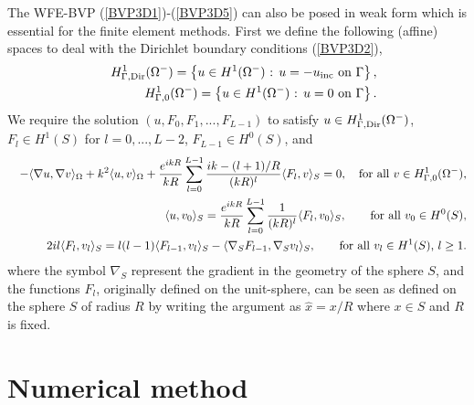 \documentclass[final,3p,times,12pt]{elsarticle}
\newcommand{\ra}{\rangle}
\newcommand{\la}{\langle}
\newcommand{\uinc}{u_{\rm inc}}
\begin{document}
The WFE-BVP (\ref{BVP3D1})-(\ref{BVP3D5}) can also be posed in weak form which is essential for the finite element methods. First we define the following (affine) spaces to deal with the Dirichlet boundary conditions (\ref{BVP3D2}),
\begin{eqnarray*}
&& H^{1}_{\rm \Gamma , Dir}(\Omega^{-}) = \left\{ \text{$u \in H^{1}(\Omega^{-})$ : $u = - \uinc$ on $\Gamma$} \right\}, \\
&& H^{1}_{\rm \Gamma,0}(\Omega^{-}) = \left\{ \text{$u \in H^{1}(\Omega^{-})$ : $u = 0$ on $\Gamma$} \right\}.
\end{eqnarray*}
We require the solution $(u,F_{0},F_{1},...,F_{L-1})$ to satisfy $u \in H^{1}_{\rm \Gamma , Dir}(\Omega^{-})$, $F_{l} \in H^{1}(S)$ for $l=0,...,L-2$, $F_{L-1} \in H^{0}(S)$, and
\begin{eqnarray}
&& - \la \nabla u , \nabla v \ra_{\Omega} + k^2 \la u , v \ra_{\Omega} + \frac{e^{ikR}}{kR}\sum_{l=0}^{L-1} \frac{ik - (l+1)/R}{(kR)^l} \la F_{l}, v \ra_{S} = 0, \quad \text{for all $v \in H^{1}_{\rm \Gamma,0}(\Omega^{-})$},  \label{BVP3Dvar1} \\
&& \la u , v_0 \ra_{S} = \frac{e^{ikR}}{kR} \sum_{l=0}^{L-1} \frac{1}{(kR)^l} \la F_{l} , v_0 \ra_{S},  \qquad \text{for all $v_0 \in H^{0}(S)$}, \label{BVP3Dvar2} \\
&& 2 i l \la F_{l} , v_l \ra_{S} = l(l-1) \la F_{l-1} , v_l \ra_{S} - \la \nabla_{S} F_{l-1}, \nabla_{S} v_l\ra_{S},  \qquad \text{for all $v_l \in H^{1}(S)$, $l \geq 1$}. \label{BVP3Dvar3}
\end{eqnarray}
where the symbol $\nabla_{S}$ represent the gradient in the geometry of the sphere $S$, and the functions $F_{l}$, originally defined on the unit-sphere, can be seen as defined on the sphere $S$ of radius $R$ by writing the argument as $\hat{x} = x/R$ where $x \in S$ and $R$ is fixed.




\section{Numerical method} \label{Section:NumMethd}
\end{document}
